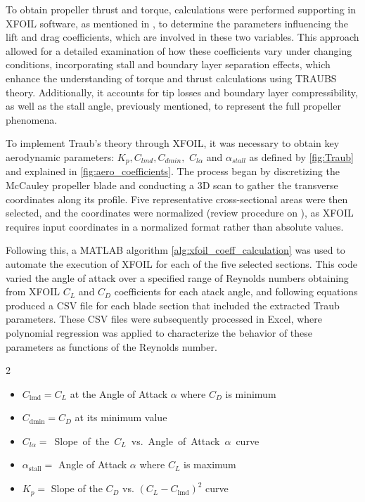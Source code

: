 \documentclass{Format}
\begin{document}
To obtain propeller thrust and torque, calculations were performed supporting in XFOIL software, as mentioned in \cite{Castellanos2023Propeller}, to determine the parameters influencing the lift and drag coefficients, which are involved in these two variables. This approach allowed for a detailed examination of how these coefficients vary under changing conditions, incorporating stall and boundary layer separation effects, which enhance the understanding of torque and thrust calculations using TRAUBS theory. Additionally, it accounts for tip losses and boundary layer compressibility, as well as the stall angle, previously mentioned, to represent the full propeller phenomena.


To implement Traub's theory through XFOIL, it was necessary to obtain key aerodynamic parameters: $K_{p}, C_{lmd}, C_{dmin},$ $C_{l\alpha}$ and $\alpha_{stall}$ as defined by \autoref{fig:Traub} and explained in \autoref{fig:aero_coefficients}. The process began by discretizing the McCauley propeller blade and conducting a 3D scan to gather the transverse coordinates along its profile. Five representative cross-sectional areas were then selected, and the coordinates were normalized (review procedure on \cite{Castellanos2023Propeller}), as XFOIL requires input coordinates in a normalized format rather than absolute values.


Following this, a MATLAB algorithm \ref{alg:xfoil_coeff_calculation} was used to automate the execution of XFOIL for each of the five selected sections. This code varied the angle of attack over a specified range of Reynolds numbers obtaining from XFOIL $C_{L}$ and $C_{D}$ coefficients for each atack angle, and following equations produced a CSV file for each blade section that included the extracted Traub parameters. These CSV files were subsequently processed in Excel, where polynomial regression was applied to characterize the behavior of these parameters as functions of the Reynolds number.
\par %
\vspace{15pt}
\begin{mdframed}[
    innermargin=3pt,
    innertopmargin=0pt,
    innerbottommargin=3pt,
    linewidth=1pt,
    roundcorner=5pt
]
    \begin{multicols}{2}
        \begin{itemize}[leftmargin=*, noitemsep, topsep=0pt, parsep=0pt, partopsep=0pt]
            \item $C_{\text{lmd}} = C_{L}$ at the Angle of Attack $\alpha$ where $C_{D}$ is minimum
            \item $C_{\text{dmin}} = C_{D}$ at its minimum value
            \item \mbox{$C_{l\alpha} =$ Slope of the $C_{L}$ vs. Angle of Attack $\alpha$ curve}
            \item $\alpha_{\text{stall}} =$ Angle of Attack $\alpha$ where $C_{L}$ is maximum
            \item $K_{p} =$ Slope of the $C_{D}$ vs. $(C_{L} - C_{\text{lmd}} )^2$ curve
        \end{itemize}
    \end{multicols}
\end{mdframed}
\end{document}
